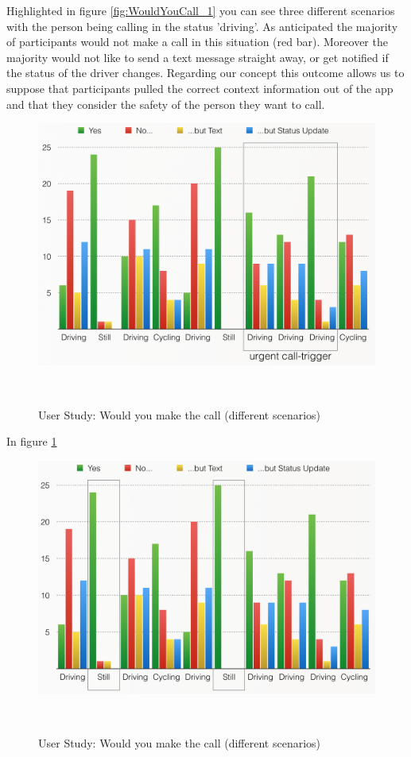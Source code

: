 \documentclass{sigchi}
\begin{document}
Highlighted in figure \ref{fig:WouldYouCall_1} you can see three different scenarios with the person being calling in the status 'driving'. As anticipated the majority of participants would not make a call in this situation (red bar). Moreover the majority would not like to send a text message straight away, or get notified if the status of the driver changes. Regarding our concept this outcome allows us to suppose that participants pulled the correct context information out of the app and that they consider the safety of the person they want to call.

\begin{figure}
\centering
  \includegraphics[width=0.9\columnwidth]{figures/WouldYouCall_2}
  \caption{User Study: Would you make the call (different scenarios)}~\label{fig:WouldYouCall_2}
\end{figure}

In figure \ref{fig:WouldYouCall_2}

\begin{figure}
\centering
  \includegraphics[width=0.9\columnwidth]{figures/WouldYouCall_3}
  \caption{User Study: Would you make the call (different scenarios)}~\label{fig:WouldYouCall_3}
\end{figure}
\end{document}

